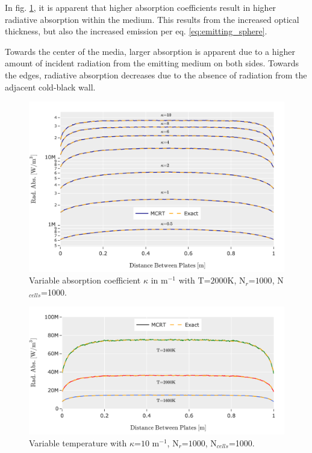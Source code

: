 In fig. \ref{fig:PPcomp_kappa}, it is apparent that higher absorption coefficients result in higher radiative absorption within the medium. This results from the increased optical thickness, but also the increased emission per eq. \ref{eq:emitting_sphere}. 

Towards the center of the media, larger absorption is apparent due to a higher amount of incident radiation from the emitting medium on both sides.
Towards the edges, radiative absorption decreases due to the absence of radiation from the adjacent cold-black wall.
\begin{figure}[!ht]
\centering
\includegraphics[width=0.95\linewidth]{figures/ch4/PPcomparison1.png}
\caption{Variable absorption coefficient $\kappa{}$ in m$^{-1}$ with T=$2000$K, N$_r$=$1000$, N$_{cells}$=1000.}
\label{fig:PPcomp_kappa}
\end{figure}
\begin{figure}[!ht]
\centering
\includegraphics[width=0.95\linewidth]{figures/ch4/PPcomparison2.png}
\caption{Variable temperature with $\kappa{}$=$10$ m$^{-1}$, N$_r$=$1000$, N$_{cells}$=1000.}
\label{fig:PPcomp_temp}
\end{figure}
